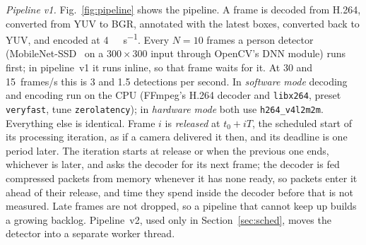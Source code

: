 \documentclass[conference]{IEEEtran}
\begin{document}
\textit{Pipeline v1.} Fig.~\ref{fig:pipeline} shows the pipeline. A frame is decoded from H.264, converted from YUV to BGR, annotated with the latest boxes, converted back to YUV, and encoded at \SI{4}{\mega\bit\per\second}. Every $N=10$ frames a person detector (MobileNet-SSD~\cite{howard2017,liu2016} on a $300{\times}300$ input through OpenCV's DNN module) runs first; in pipeline~v1 it runs inline, so that frame waits for it. At 30 and 15~frames/s this is 3 and 1.5 detections per second. In \emph{software mode} decoding and encoding run on the CPU (FFmpeg's H.264 decoder and \texttt{libx264}, preset \texttt{veryfast}, tune \texttt{zerolatency}); in \emph{hardware mode} both use \texttt{h264\_v4l2m2m}. Everything else is identical. Frame $i$ is \emph{released} at $t_0 + iT$, the scheduled start of its processing iteration, as if a camera delivered it then, and its deadline is one period later. The iteration starts at release or when the previous one ends, whichever is later, and asks the decoder for its next frame; the decoder is fed compressed packets from memory whenever it has none ready, so packets enter it ahead of their release, and time they spend inside the decoder before that is not measured. Late frames are not dropped, so a pipeline that cannot keep up builds a growing backlog. Pipeline~v2, used only in Section~\ref{sec:sched}, moves the detector into a separate worker thread.
\end{document}

